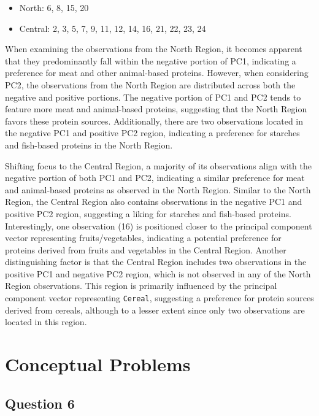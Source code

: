 \documentclass[
]{article}
\providecommand{\tightlist}{%
  \setlength{\itemsep}{0pt}\setlength{\parskip}{0pt}}
\begin{document}
\begin{itemize}
\tightlist
\item
  North: 6, 8, 15, 20
\item
  Central: 2, 3, 5, 7, 9, 11, 12, 14, 16, 21, 22, 23, 24
\end{itemize}

When examining the observations from the North Region, it becomes
apparent that they predominantly fall within the negative portion of
PC1, indicating a preference for meat and other animal-based proteins.
However, when considering PC2, the observations from the North Region
are distributed across both the negative and positive portions. The
negative portion of PC1 and PC2 tends to feature more meat and
animal-based proteins, suggesting that the North Region favors these
protein sources. Additionally, there are two observations located in the
negative PC1 and positive PC2 region, indicating a preference for
starches and fish-based proteins in the North Region.

Shifting focus to the Central Region, a majority of its observations
align with the negative portion of both PC1 and PC2, indicating a
similar preference for meat and animal-based proteins as observed in the
North Region. Similar to the North Region, the Central Region also
contains observations in the negative PC1 and positive PC2 region,
suggesting a liking for starches and fish-based proteins. Interestingly,
one observation (16) is positioned closer to the principal component
vector representing fruits/vegetables, indicating a potential preference
for proteins derived from fruits and vegetables in the Central Region.
Another distinguishing factor is that the Central Region includes two
observations in the positive PC1 and negative PC2 region, which is not
observed in any of the North Region observations. This region is
primarily influenced by the principal component vector representing
\texttt{Cereal}, suggesting a preference for protein sources derived
from cereals, although to a lesser extent since only two observations
are located in this region.

\hypertarget{conceptual-problems}{%
\section{Conceptual Problems}\label{conceptual-problems}}

\hypertarget{question-6}{%
\subsection{Question 6}\label{question-6}}
\end{document}
